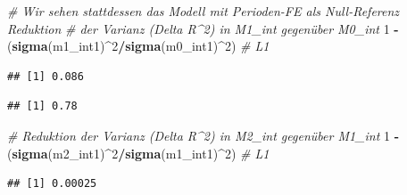 \documentclass[
]{book}
\newenvironment{Shaded}{\begin{snugshade}}{\end{snugshade}}
\newcommand{\CommentTok}[1]{\textcolor[rgb]{0.56,0.35,0.01}{\textit{#1}}}
\newcommand{\DecValTok}[1]{\textcolor[rgb]{0.00,0.00,0.81}{#1}}
\newcommand{\KeywordTok}[1]{\textcolor[rgb]{0.13,0.29,0.53}{\textbf{#1}}}
\newcommand{\NormalTok}[1]{#1}
\newcommand{\OperatorTok}[1]{\textcolor[rgb]{0.81,0.36,0.00}{\textbf{#1}}}
\newcommand{\StringTok}[1]{\textcolor[rgb]{0.31,0.60,0.02}{#1}}
\begin{document}
\begin{Shaded}
\begin{Highlighting}[]
\CommentTok{# Wir sehen stattdessen das Modell mit Perioden-FE als Null-Referenz Reduktion}
\CommentTok{# der Varianz (Delta R^2) in M1_int gegenüber M0_int}
\DecValTok{1} \OperatorTok{-}\StringTok{ }\NormalTok{(}\KeywordTok{sigma}\NormalTok{(m1_int1)}\OperatorTok{^}\DecValTok{2}\OperatorTok{/}\KeywordTok{sigma}\NormalTok{(m0_int1)}\OperatorTok{^}\DecValTok{2}\NormalTok{)  }\CommentTok{# L1}
\end{Highlighting}
\end{Shaded}

\begin{verbatim}
## [1] 0.086
\end{verbatim}

\begin{Shaded}
\end{Shaded}

\begin{verbatim}
## [1] 0.78
\end{verbatim}

\begin{Shaded}
\begin{Highlighting}[]
\CommentTok{# Reduktion der Varianz (Delta R^2) in M2_int gegenüber M1_int}
\DecValTok{1} \OperatorTok{-}\StringTok{ }\NormalTok{(}\KeywordTok{sigma}\NormalTok{(m2_int1)}\OperatorTok{^}\DecValTok{2}\OperatorTok{/}\KeywordTok{sigma}\NormalTok{(m1_int1)}\OperatorTok{^}\DecValTok{2}\NormalTok{)  }\CommentTok{# L1}
\end{Highlighting}
\end{Shaded}

\begin{verbatim}
## [1] 0.00025
\end{verbatim}

\begin{Shaded}
\end{Shaded}
\end{document}
